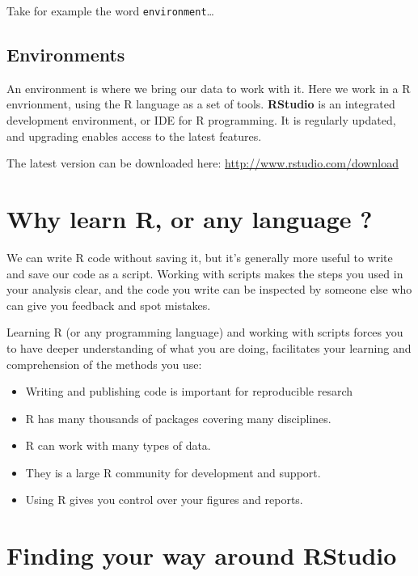 \documentclass[12pt,]{book}
\providecommand{\tightlist}{%
  \setlength{\itemsep}{0pt}\setlength{\parskip}{0pt}}
\begin{document}
Take for example the word \texttt{environment}\ldots{}

\hypertarget{environments}{%
\subsection{Environments}\label{environments}}

An environment is where we bring our data to work with it. Here we work in a R
envrionment, using the R language as a set of tools.
\textbf{RStudio} is an integrated development environment, or IDE for R programming.
It is regularly updated, and upgrading enables access to the latest features.

The latest version can be downloaded here: \url{http://www.rstudio.com/download}

\hypertarget{why-learn-r-or-any-language}{%
\section{Why learn R, or any language ?}\label{why-learn-r-or-any-language}}

We can write R code without saving it, but it's generally more useful to write
and save our code as a script. Working with scripts makes the steps you used in
your analysis clear, and the code you write can be inspected by someone else who
can give you feedback and spot mistakes.

Learning R (or any programming language) and working with scripts forces you to
have deeper understanding of what you are doing, facilitates your learning
and comprehension of the methods you use:

\begin{itemize}
\tightlist
\item
  Writing and publishing code is important for reproducible resarch
\item
  R has many thousands of packages covering many disciplines.
\item
  R can work with many types of data.
\item
  They is a large R community for development and support.
\item
  Using R gives you control over your figures and reports.
\end{itemize}

\hypertarget{finding-your-way-around-rstudio}{%
\section{Finding your way around RStudio}\label{finding-your-way-around-rstudio}}
\end{document}
